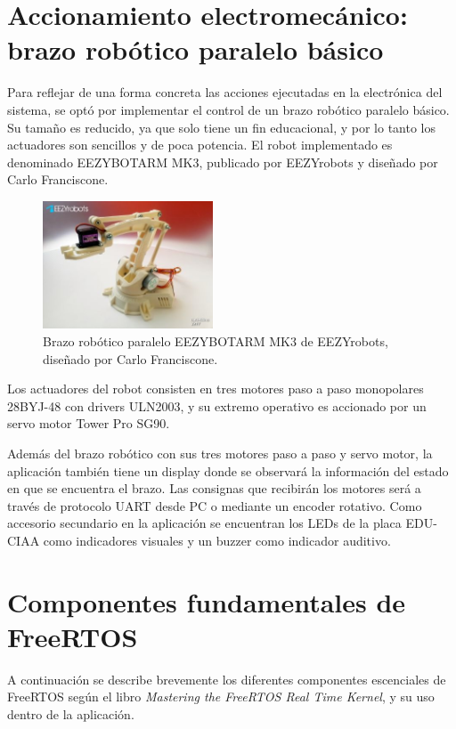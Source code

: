\documentclass{IEEEtran}
\begin{document}
\section{Accionamiento electromecánico: brazo robótico paralelo básico}
Para reflejar de una forma concreta las acciones ejecutadas en la electrónica del sistema, se optó por implementar el control de un brazo robótico paralelo básico. Su tamaño es reducido, ya que solo tiene un fin educacional, y por lo tanto los actuadores son sencillos y de poca potencia. El robot implementado es denominado EEZYBOTARM MK3, publicado por EEZYrobots y diseñado por Carlo Franciscone. 

\begin{figure}[ht]
    \centering
    \includegraphics[width=0.45\textwidth]{../robot_arm.jpg}
    \caption{Brazo robótico paralelo EEZYBOTARM MK3 de EEZYrobots, diseñado por Carlo Franciscone.}
    \label{fig:robot-arm}
\end{figure}

Los actuadores del robot consisten en tres motores paso a paso monopolares 28BYJ-48 con drivers ULN2003, y su extremo operativo es accionado por un servo motor Tower Pro SG90.

Además del brazo robótico con sus tres motores paso a paso y servo motor, la aplicación también tiene un display donde se observará la información del estado en que se encuentra el brazo. Las consignas que recibirán los motores será a través de protocolo UART desde PC o mediante un encoder rotativo. Como accesorio secundario en la aplicación se encuentran los LEDs de la placa EDU-CIAA como indicadores visuales y un buzzer como indicador auditivo.

\section{Componentes fundamentales de FreeRTOS}
A continuación se describe brevemente los diferentes componentes escenciales de FreeRTOS según el libro \textit{Mastering the FreeRTOS Real Time Kernel}, y su uso dentro de la aplicación.
\end{document}
